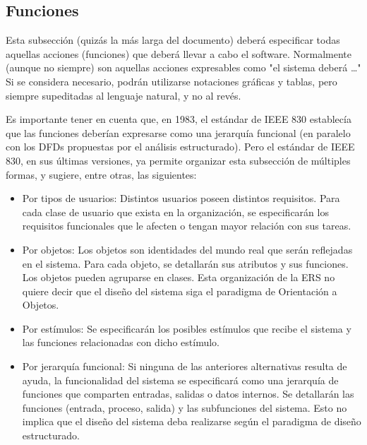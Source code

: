 \documentclass[12pt,a4paper, twosite]{article}
\begin{document}
	
	\subsection{Funciones}
	\label{sec:org307bb59}
	
	Esta subsección (quizás la más larga del documento) deberá
	especificar todas aquellas acciones (funciones) que deberá llevar a
	cabo el software. Normalmente (aunque no siempre) son aquellas
	acciones expresables como "el sistema deberá \ldots{}" Si se considera
	necesario, podrán utilizarse notaciones gráficas y tablas, pero
	siempre supeditadas al lenguaje natural, y no al revés.
	
	Es importante tener en cuenta que, en 1983, el estándar de IEEE 830
	establecía que las funciones deberían expresarse como una jerarquía
	funcional (en paralelo con los DFDs propuestas por el análisis
	estructurado). Pero el estándar de IEEE 830, en sus últimas
	versiones, ya permite organizar esta subsección de múltiples formas,
	y sugiere, entre otras, las siguientes:
	
	
	\begin{itemize}
		\item Por tipos de usuarios: 
		Distintos usuarios poseen distintos requisitos. Para cada clase de
		usuario que exista en la organización, se especificarán los
		requisitos funcionales que le afecten o tengan mayor relación con
		sus tareas.
	\end{itemize}
	
	
	\begin{itemize}
		\item Por objetos:
		Los objetos son identidades del mundo real que serán reflejadas en
		el sistema. Para cada objeto, se detallarán sus atributos y sus
		funciones. Los objetos pueden agruparse en clases. Esta organización
		de la ERS no quiere decir que el diseño del sistema siga el
		paradigma de Orientación a Objetos.
	\end{itemize}
	
	
	\begin{itemize}
		\item Por estímulos: 
		Se especificarán los posibles estímulos que recibe el sistema y las
		funciones relacionadas con dicho estímulo.
	\end{itemize}
	
	
	\begin{itemize}
		\item Por jerarquía funcional: 
		Si ninguna de las anteriores alternativas resulta de ayuda, la
		funcionalidad del sistema se especificará como una jerarquía de
		funciones que comparten entradas, salidas o datos internos. Se
		detallarán las funciones (entrada, proceso, salida) y las
		subfunciones del sistema. Esto no implica que el diseño del sistema
		deba realizarse según el paradigma de diseño estructurado.
	\end{itemize}
	
\end{document}
